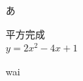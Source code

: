 \documentclass[unicode,12pt,aspectratio=169]{beamer}%
\begin{document}
\color{white}
あ

\begin{frame}
 \begin{center}
  \fontsize{35pt}{0pt}\selectfont 平方完成\\
  \fontsize{55pt}{0cm}\selectfont $y=2x^2-4x+1$  
 \end{center}

\end{frame}
\begin{frame}
 wai
\end{frame}
\end{document}

